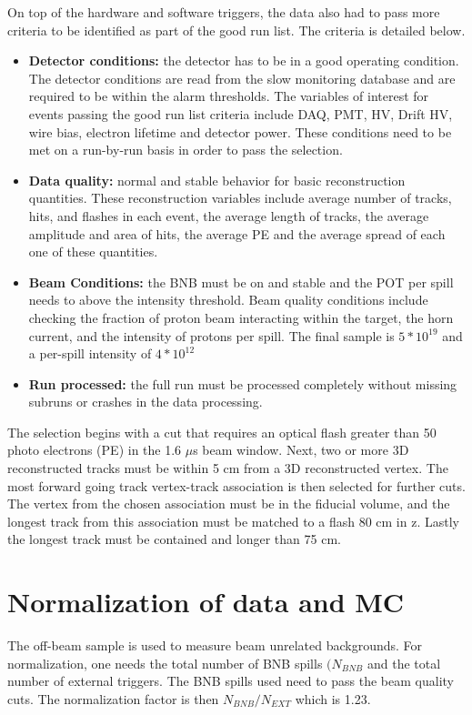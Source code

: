 On top of the hardware and software triggers, the data also had to pass more criteria to be identified as part of the good run list. The criteria is detailed below.
\begin{itemize}
\item{\textbf{Detector conditions:} the detector has to be in a good operating condition. The detector conditions are read from the slow monitoring database and are required to be within the alarm thresholds. The variables of interest for events passing the good run list criteria include DAQ, PMT, HV, Drift HV, wire bias, electron lifetime and detector power. These conditions need to be met on a run-by-run basis in order to pass the selection.}
\item{\textbf{Data quality:} normal and stable behavior for basic reconstruction quantities. These reconstruction variables include average number of tracks, hits, and flashes in each event, the average length of tracks, the average amplitude and area of hits, the average PE and the average spread of each one of these quantities.}
\item{\textbf{Beam Conditions:} the BNB must be on and stable and the POT per spill needs to above the intensity threshold. Beam quality conditions include checking the fraction of proton beam interacting within the target, the horn current, and the intensity of protons per spill. The final sample is $5 * 10^{19}$ and a per-spill intensity of $4 * 10^{12}$}
\item{\textbf{Run processed:} the full run must be processed completely without missing subruns or crashes in the data processing.}
\end{itemize}

The selection begins with a cut that requires an optical flash greater than 50 photo electrons (PE) in the 1.6 $\mu$s beam window. Next, two or more 3D reconstructed tracks must be within 5 cm from a 3D reconstructed vertex. The most forward going track vertex-track association is then selected for further cuts. The vertex from the chosen association must be in the fiducial volume, and the longest track from this association must be matched to a flash 80 cm in z. Lastly the longest track must be contained and longer than 75 cm.       

\section{Normalization of data and MC}
The off-beam sample is used to measure beam unrelated backgrounds. For normalization, one needs the total number of BNB spills \textit{$(N_{BNB}$} and the total number of external triggers. The BNB spills used need to pass the beam quality cuts. The normalization factor is then \textit{$N_{BNB}/N_{EXT}$} which is 1.23. 

